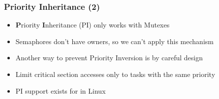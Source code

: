 \begin{frame}
	\frametitle{Priority Inheritance (2)}
	\begin{itemize}
		\item \textbf{P}riority \textbf{I}nheritance (PI) only works with Mutexes
		\item Semaphores don't have owners, so we can't apply this mechanism
		\item Another way to prevent Priority Inversion is by careful design
		\item Limit critical section accesses only to tasks with the same priority
		\item PI support exists for  in Linux
	\end{itemize}
\end{frame}
